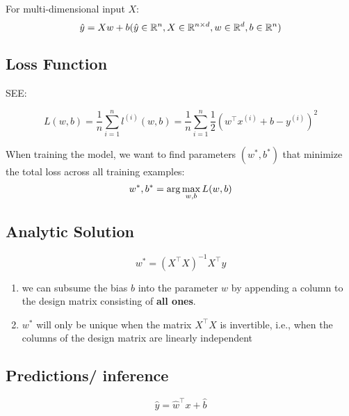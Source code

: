 \noindent
For multi-dimensional input $X$:
\[
    \hfill
    \hat{y} = Xw + b
    \hfill
    (
        \hat{y} \in \mathbb{R}^n,
        X \in \mathbb{R}^{n\times d}, 
        w \in \mathbb{R}^d,
        b \in \mathbb{R}^n
    )
\]

\subsection{Loss Function}
SEE: 

\[
    L(w,b) = \dfrac{1}{n}
    \displaystyle\sum_{i=1}^{n} l^{(i)}(w,b)
    = \dfrac{1}{n} \displaystyle\sum_{i=1}^{n}
    \dfrac{1}{2}\left( w^\top x^{(i)} + b - y^{(i)} \right)^2
\]

When training the model, we want to find parameters $(w^\ast, b^\ast)$ that minimize the total loss
across all training examples:
\[
    \displaystyle
    \hfill
        w^\ast, b^\ast = \arg\max_{w,b} L(w,b)
    \hfill
\]

\subsection{Analytic Solution}


\[
    w^\ast = (X^\top X)^{-1}X^\top y
\]

\begin{enumerate}
    \item we can subsume the bias $b$ into the parameter $w$ by appending a column to the design matrix consisting of \textbf{all ones}.

    \item $w^\ast$ will only be unique when the matrix $X^\top X$ is invertible, i.e., when the columns of the design matrix are linearly independent
\end{enumerate}


\subsection{Predictions/ inference}
\[
    \hat{y} = \hat{w}^\top x + \hat{b}
\]















































